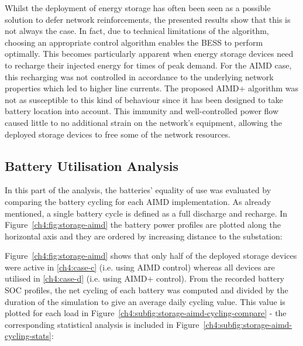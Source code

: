 Whilst the deployment of energy storage has often been seen as a possible solution to defer network reinforcements, the presented results show that this is not always the case.
In fact, due to technical limitations of the algorithm, choosing an appropriate control algorithm enables the BESS to perform optimally.
This becomes particularly apparent when  energy storage devices need to recharge their injected energy for times of peak demand.
For the AIMD case, this recharging was not controlled in accordance to the underlying network properties which led to higher line currents.
The proposed AIMD+ algorithm was not as susceptible to this kind of behaviour since it has been designed to take battery location into account.
This immunity and well-controlled power flow caused little to no additional strain on the network's equipment, allowing the deployed storage devices to free some of the network resources.

\subsection{Battery Utilisation Analysis}

In this part of the analysis, the batteries' equality of use was evaluated by comparing the battery cycling for each AIMD implementation.
As already mentioned, a single battery cycle is defined as a full discharge and recharge.
In Figure~\ref{ch4:fig:storage-aimd} the battery power profiles are plotted along the horizontal axis and they are ordered by increasing distance to the substation:



Figure~\ref{ch4:fig:storage-aimd} shows that only half of the deployed storage devices were active in \ref{ch4:case-c} (i.e. using AIMD control) whereas all devices are utilised in \ref{ch4:case-d} (i.e. using AIMD+ control).
From the recorded battery SOC profiles, the net cycling of each battery was computed and divided by the duration of the simulation to give an average daily cycling value.
This value is plotted for each load in Figure~\ref{ch4:subfig:storage-aimd-cycling-compare} - the corresponding statistical analysis is included in Figure~\ref{ch4:subfig:storage-aimd-cycling-stats}:



